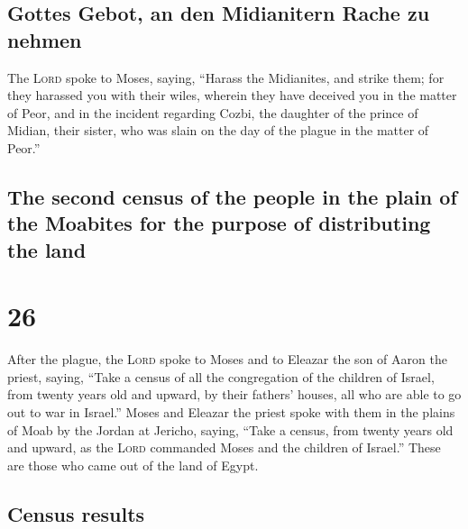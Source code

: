 \hypertarget{gottes-gebot-an-den-midianitern-rache-zu-nehmen}{%
\subsection{Gottes Gebot, an den Midianitern Rache zu
nehmen}\label{gottes-gebot-an-den-midianitern-rache-zu-nehmen}}

 The \textsc{Lord} spoke to Moses, saying,
 ``Harass the Midianites, and strike them;
 for they harassed you with their wiles, wherein they
have deceived you in the matter of Peor, and in the incident regarding
Cozbi, the daughter of the prince of Midian, their sister, who was slain
on the day of the plague in the matter of Peor.''

\hypertarget{the-second-census-of-the-people-in-the-plain-of-the-moabites-for-the-purpose-of-distributing-the-land}{%
\subsection{The second census of the people in the plain of the Moabites
for the purpose of distributing the
land}\label{the-second-census-of-the-people-in-the-plain-of-the-moabites-for-the-purpose-of-distributing-the-land}}

\hypertarget{section-25}{%
\section{26}\label{section-25}}

 After the plague, the \textsc{Lord} spoke to Moses and to
Eleazar the son of Aaron the priest, saying,  ``Take a
census of all the congregation of the children of Israel, from twenty
years old and upward, by their fathers' houses, all who are able to go
out to war in Israel.''  Moses and Eleazar the priest
spoke with them in the plains of Moab by the Jordan at Jericho, saying,
 ``Take a census, from twenty years old and upward, as the
\textsc{Lord} commanded Moses and the children of Israel.'' These are
those who came out of the land of Egypt.

\hypertarget{census-results-1}{%
\subsection{Census results}\label{census-results-1}}

